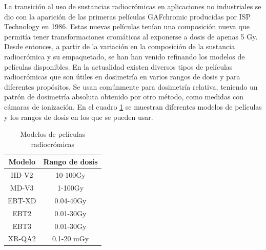La transición al uso de sustancias radiocrómicas en aplicaciones no industriales se dio con la aparición de las primeras películas GAFchromic producidas por ISP Technology en 1986. Estas nuevas películas tenían una composición nueva que permitía tener transformaciones cromáticas al exponerse a dosis de apenas 5 Gy\cite{Williams2011}.\\


Desde entonces, a partir de la variación en la composición de la sustancia radiocrómica y su empaquetado, se han han venido refinando los modelos de películas disponibles. En la actualidad existen diversos tipos de películas radiocrómicas que son útiles en dosimetría en varios rangos de dosis y para diferentes propósitos. Se usan comúnmente para dosimetría relativa, teniendo un patrón de dosimetría absoluta obtenido por otro método, como medidas con cámaras de ionización. En el cuadro \ref{tab:Modelos} se muestran diferentes modelos de películas y los rangos de dosis en los que se pueden usar.\\
\begin{table}[h!]
	\centering
	\begin{tabular}{|c|c|}
		
		\hline 
		Modelo & Rango de dosis \\ 
		\hline 
		HD-V2 & 10-100Gy \\ 
		\hline 
		MD-V3 & 1-100Gy \\ 
		\hline 
		EBT-XD & 0.04-40Gy \\ 
		\hline 
		EBT2 & 0.01-30Gy \\ 
		\hline 
		EBT3 & 0.01-30Gy \\ 
		\hline 
		XR-QA2 & 0.1-20 mGy \\ 
		\hline 
	\end{tabular} 
\caption{Modelos de películas radiocrómicas}
\label{tab:Modelos}
\end{table}

